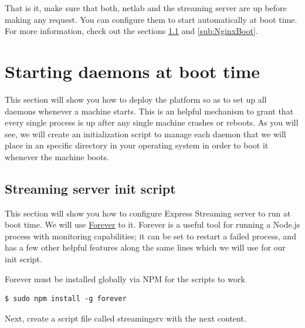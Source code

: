\documentclass{article}
\begin{document}
That is it, make sure that both, netlab and the streaming server are up before making any request. You can configure them to start automatically at boot time. For more information, check out the sections \ref{sub:StreamingSRVBoot} and \ref{sub:NginxBoot}.

\section{Starting daemons at boot time}
This section will show you how to deploy the platform so as to set up all daemons whenever a machine starts. This is an helpful mechanism to grant that every single process is up after any single machine crashes or reboots. As you will see, we will create an initialization script to manage each daemon that we will place in an specific directory in your operating system in order to boot it whenever the machine boots.


\label{sec:Boot}

\subsection{Streaming server init script}
\label{sub:StreamingSRVBoot}
This section will show you how to configure Express Streaming server to run at boot time. We will use \href{https://github.com/nodejitsu/forever}{Forever} to it. Forever is a useful tool for running a Node.js process with monitoring capabilities; it can be set to restart a failed process, and has a few other helpful features along the same lines which we will use for our init script.

Forever must be installed globally via NPM for the scripts to work

\begin{verbatim}
$ sudo npm install -g forever
\end{verbatim}

Next, create a script file called streamingsrv with the next content.
 
\end{document}
